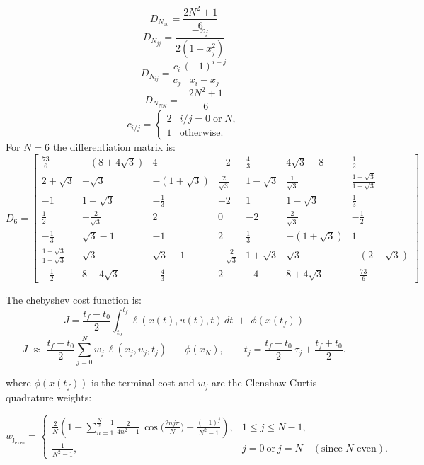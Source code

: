 \documentclass[]{article}
\begin{document}
	\[
       D_{N_{00}}=\frac{2N^2+1}{6}
        \]
	\[
       D_{N_{jj}}=\frac{-x_j}{2(1-x_j^2)}
        \]
	\[
       D_{N_{ij}}=\frac{c_i}{c_j}\frac{(-1)^{i+j}}{x_i-x_j}
        \]
	\[
       D_{N_{NN}}=-\frac{2N^2+1}{6}
        \]
	\[
        c_{i/j}=
        \begin{cases}
        2 & i/j = 0 \;\text{or}\; N, \\
        1 & \text{otherwise}.
        \end{cases}
        \]
For $N=6$ the differentiation matrix is:
        \[
        D_{6} =
        \begin{bmatrix}
        \frac{73}{6} & -(8+4\sqrt{3})  & 4 & -2 & \frac{4}{3} & 4\sqrt{3} - 8 & \frac{1}{2}\\
        2+\sqrt{3} & -\sqrt{3} & -(1+\sqrt{3}) & \frac{2}{\sqrt{3}} & 1-\sqrt{3} & \frac{1}{\sqrt{3}} & \frac{1-\sqrt{3}}{1+\sqrt{3}}\\
        -1 & 1+\sqrt{3} & -\frac{1}{3} & -2 & 1 & 1-\sqrt{3} & \frac{1}{3}\\
        \frac{1}{2} & -\frac{2}{\sqrt{3}} & 2 & 0 & -2 & \frac{2}{\sqrt{3}} & -\frac{1}{2}\\
        -\frac{1}{3} & \sqrt{3}-1 & -1 & 2 & \frac{1}{3} & -(1+\sqrt{3}) & 1\\
        \frac{1-\sqrt{3}}{1+\sqrt{3}} & \sqrt{3} & \sqrt{3}-1 & -\frac{2}{\sqrt{3}} & 1+\sqrt{3} & \sqrt{3} &-( 2+\sqrt{3})\\
        -\frac{1}{2} & 8-4\sqrt{3} & -\frac{4}{3} & 2 & -4 & 8+4\sqrt{3} &  -\frac{73}{6}
        \end{bmatrix}
        \]
        
        The chebyshev cost function is:
        	\[
	J=\frac{t_f-t_0}{2}\int_{t_0}^{t_f} \ell(x(t),u(t),t)\,dt \;+\; \phi(x(t_f))
        \]
        \[
        J \;\approx\; \frac{t_f-t_0}{2} \sum_{j=0}^{N} w_j \,\ell(x_j,u_j,t_j)
        \;+\; \phi(x_N),
        \qquad t_j = \frac{t_f-t_0}{2}\,\tau_j + \frac{t_f+t_0}{2}.
        \]
        	
        where $\phi(x(t_f))$ is the terminal cost and  $w_j$ are the Clenshaw-Curtis quadrature weights:

        \[
        w_{\mathrm{j_{even}}} =
        \begin{cases}
        \displaystyle
        \frac{2}{N}\!\left(
        1 - \sum_{n=1}^{\frac{N}{2}-1} \frac{2}{4n^{2}-1}\,
        \cos\!\Big(\tfrac{2 n j \pi}{N}\Big)
        -\frac{(-1)^{j}}{N^{2}-1}
        \right), & 1 \le j \le N-1, \\[2.0ex]
        \displaystyle \frac{1}{N^{2}-1}, & j=0\ \text{or}\ j=N \quad(\text{since \(N\) even}).
        \end{cases}
        \]
\end{document}
